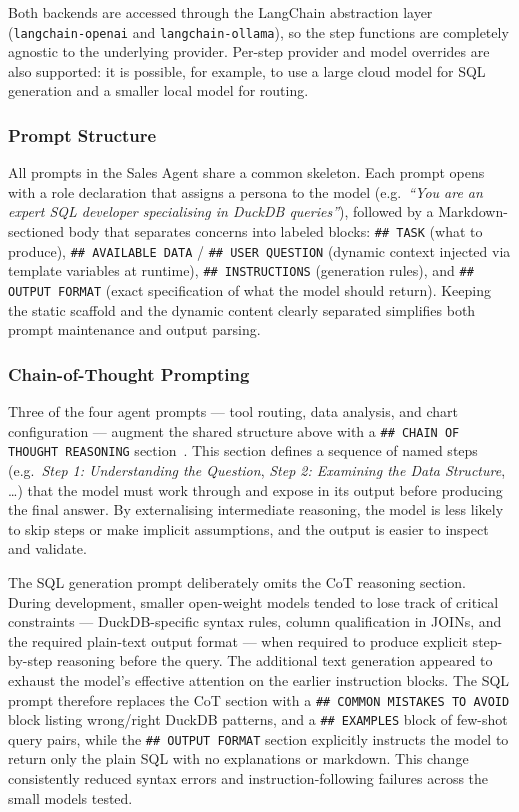 Both backends are accessed through the LangChain abstraction layer
(\texttt{langchain-openai} and \texttt{langchain-ollama}), so the step functions
are completely agnostic to the underlying provider. Per-step provider and model
overrides are also supported: it is possible, for example, to use a large cloud
model for SQL generation and a smaller local model for routing.

\subsubsection{Prompt Structure}

All prompts in the Sales Agent share a common skeleton. Each prompt opens with a
role declaration that assigns a persona to the model (e.g.\
\textit{``You are an expert SQL developer specialising in DuckDB queries''}), followed
by a Markdown-sectioned body that separates concerns into labeled blocks:
\texttt{\#\# TASK} (what to produce), \texttt{\#\# AVAILABLE DATA} / \texttt{\#\# USER QUESTION}
(dynamic context injected via template variables at runtime), \texttt{\#\# INSTRUCTIONS}
(generation rules), and \texttt{\#\# OUTPUT FORMAT} (exact specification of what the
model should return). Keeping the static scaffold and the dynamic content clearly
separated simplifies both prompt maintenance and output parsing.

\subsubsection{Chain-of-Thought Prompting}

Three of the four agent prompts — tool routing, data analysis, and chart configuration
— augment the shared structure above with a \texttt{\#\# CHAIN OF THOUGHT REASONING}
section~\cite{wei2022chain}. This section defines a sequence of named steps (e.g.\
\textit{Step 1: Understanding the Question}, \textit{Step 2: Examining the Data
Structure}, \ldots) that the model must work through and expose in its output before
producing the final answer. By externalising intermediate reasoning, the model is less
likely to skip steps or make implicit assumptions, and the output is easier to inspect
and validate.

The SQL generation prompt deliberately omits the CoT reasoning section.
During development, smaller open-weight models tended to lose track
of critical constraints — DuckDB-specific syntax rules, column qualification in JOINs,
and the required plain-text output format — when required to produce explicit
step-by-step reasoning before the query. The additional text generation appeared to
exhaust the model's effective attention on the earlier instruction blocks. The SQL
prompt therefore replaces the CoT section with a \texttt{\#\# COMMON MISTAKES TO AVOID}
block listing wrong/right DuckDB patterns, and a \texttt{\#\# EXAMPLES} block of
few-shot query pairs, while the \texttt{\#\# OUTPUT FORMAT} section explicitly
instructs the model to return only the plain SQL with no explanations or markdown.
This change consistently reduced syntax errors and instruction-following failures
across the small models tested.

